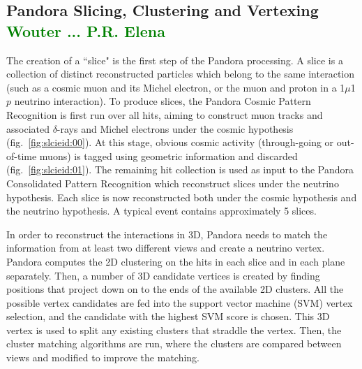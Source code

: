 \subsection{Pandora Slicing, Clustering and Vertexing \textcolor{green}{Wouter ... P.R. Elena}}
The creation of a ``slice" is the first step of the Pandora processing. A slice is a collection of distinct reconstructed particles which belong to the same interaction (such as a cosmic muon and its Michel electron, or the muon and proton in a 1$\mu$1$p$ neutrino interaction). To produce slices, the Pandora Cosmic Pattern Recognition is first run over all hits, aiming to construct muon tracks and associated $\delta$-rays and Michel electrons under the cosmic hypothesis (fig.~\ref{fig:slcieid:00}). At this stage, obvious cosmic activity (through-going or out-of-time muons) is tagged using geometric information and discarded (fig.~\ref{fig:slcieid:01}). The remaining hit collection is used as input to the Pandora Consolidated Pattern Recognition which reconstruct slices under the neutrino hypothesis. Each slice is now reconstructed both under the cosmic hypothesis and the neutrino hypothesis. A typical event contains approximately 5 slices. 

\par In order to reconstruct the interactions in 3D, Pandora needs to match the information from at least two different views and create a neutrino vertex. Pandora computes the 2D clustering on the hits in each slice and in each plane separately. Then, a number of 3D candidate vertices is created by finding positions that project down on to the ends of the available 2D clusters. All the possible vertex candidates are fed into the support vector machine (SVM) vertex selection, and the candidate with the highest SVM score is chosen. This 3D vertex is used to split any existing clusters that straddle the vertex. Then, the cluster matching algorithms are run, where the clusters are compared between views and modified to improve the matching.


